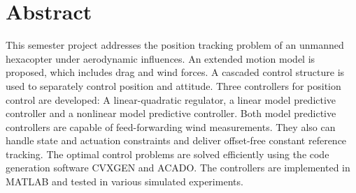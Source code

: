 \chapter*{Abstract}

This semester project addresses the position tracking problem of an unmanned hexacopter under aerodynamic influences. An extended motion model is proposed, which includes drag and wind forces. A cascaded control structure is used to separately control position and attitude. Three controllers for position control are developed: A linear-quadratic regulator, a linear model predictive controller and a nonlinear model predictive controller. Both model predictive controllers are capable of feed-forwarding wind measurements. They also can handle state and actuation constraints and deliver offset-free constant reference tracking. The optimal control problems are solved efficiently using the code generation software CVXGEN and ACADO. The controllers are implemented in MATLAB and tested in various simulated experiments. 